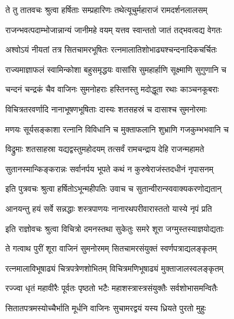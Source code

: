 

\twolineshloka
{ते तु तातवचः श्रुत्वा हर्षिताः सम्प्रहारिणः}
{तथेत्यूचुर्महाराजं रामदर्शनलालसम्}%


\twolineshloka
{राजन्भवत्पदाम्भोजान्नान्यं जानीमहे वयम्}
{यत्तव स्वान्ततो जातं तद्भवत्वद्य वेगतः}%

\twolineshloka
{अश्वोऽयं नीयतां तत्र सितचामरभूषितः}
{रत्नमालातिशोभाढ्यश्चन्दनादिकचर्चितः}%

\twolineshloka
{राज्यमाज्ञाफलं स्वामिन्कोशा बहुसमृद्धयः}
{वासांसि सुमहार्हाणि सूक्ष्माणि सुगुणानि च}%

\twolineshloka
{चन्दनं चन्द्रकं चैव वाजिनः सुमनोहराः}
{हस्तिनस्तु मदोद्धूता रथाः काञ्चनकूबराः}%

\twolineshloka
{विचित्रतरवर्णादि नानाभूषणभूषिताः}
{दास्यः शतसहस्रं च दासाश्च सुमनोरमाः}%

\twolineshloka
{मणयः सूर्यसङ्काशा रत्नानि विविधानि च}
{मुक्ताफलानि शुभ्राणि गजकुम्भभवानि च}%

\twolineshloka
{विद्रुमाः शतसाहस्रा यद्यद्वस्तुमहोदयम्}
{तत्सर्वं रामचन्द्राय देहि राजन्महामते}%

\twolineshloka
{सुतानस्मान्किङ्करान्नः सर्वानर्पय भूपते}
{कथं न कुरुषेराजंस्तदधीनं नृपासनम्}%


\twolineshloka
{इति पुत्रवचः श्रुत्वा हर्षितोऽभून्महीपतिः}
{उवाच च सुतान्वीरान्स्ववाक्यकरणोद्यतान्}%


\twolineshloka
{आनयन्तु हयं सर्वे सन्नद्धाः शस्त्रपाणयः}
{नानारथपरीवारास्ततो यास्ये नृपं प्रति}%


\twolineshloka
{इति राज्ञोवचः श्रुत्वा विचित्रो दमनस्तथा}
{सुकेतुः समरे शूरा जग्मुस्तस्याज्ञयोद्यताः}%

\twolineshloka
{ते गत्वाथ पुरीं शूरा वाजिनं सुमनोरमम्}
{सितचामरसंयुक्तं स्वर्णपत्राद्यलङ्कृतम्}%

\twolineshloka
{रत्नमालाविभूषाढ्यं चित्रपत्रेणशोभितम्}
{विचित्रमणिभूषाढ्यं मुक्ताजालस्वलङ्कृतम्}%

\twolineshloka
{रज्ज्वा धृतं महावीरैः पूर्वतः पृष्ठतो भटैः}
{महाशस्त्रास्त्रसंयुक्तैः सर्वशोभासमन्वितैः}%

\twolineshloka
{सितातपत्रमस्योच्चैर्भाति मूर्धनि वाजिनः}
{सुचामरद्वयं यस्य ध्रियते पुरतो मुहुः}%

